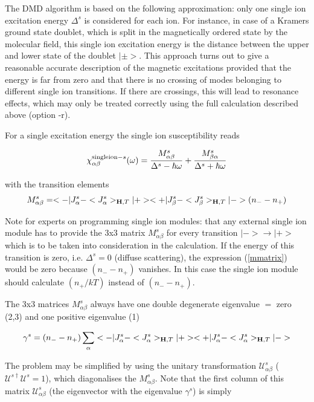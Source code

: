  The DMD algorithm is
  based on the following approximation:
  only one single ion excitation energy
$\Delta^s$ is considered for each ion. For instance, in case of a Kramers ground state
doublet, which is split in the magnetically ordered state by the molecular
field, this single ion excitation energy is the distance between the upper
and lower state of the doublet $|\pm>$.
 This approach turns out to 
give a reasonable accurate description of the magnetic excitations provided
that the energy is far from zero and that there is no crossing of modes
belonging to different single ion transitions. If there are crossings, this will lead to
resonance effects, which may only be treated correctly using the full calculation
described above (option {\prg -r}).

For a single excitation energy the single ion susceptibility
reads

\begin{equation}
\chi^{{\rm single ion-} s}_{\alpha\beta}(\omega)=
\frac{M^s_{\alpha\beta}}{\Delta^s-\hbar \omega}+
\frac{M^s_{\beta\alpha}}{\Delta^s+\hbar \omega}
\end{equation}

with the transition elements
\begin{equation}\label{mmatrix}
M^s_{\alpha\beta}=<-|J^s_{\alpha}-<J^s_{\alpha}>_{\mathbf H,T}|+><+|J^s_{\beta}-<J^s_{\beta}>_{\mathbf H,T}|->
(n_--n_+)
\end{equation}

{\tiny Note for experts on programming single ion modules: that any external single ion module has to provide the 3x3 %
matrix $M^s_{\alpha\beta}$ for every transition
$|-> \rightarrow |+>$which is to be taken into consideration in the calculation. If the energy of this transition
is zero, i.e. $\Delta^s=0$ (diffuse scattering), the expression (\ref{mmatrix}) would be zero because $(n_--n_+)$ %
vanishes.
In this case the single ion module should calculate $(n_+/kT)$ instead of $(n_--n_+)$.
}
   
 The 3x3 matrices $M^s_{\alpha\beta}$
always have one double degenerate eigenvalue $=$ zero (2,3) and one 
positive eigenvalue (1)

\begin{equation}
\gamma^s=(n_--n_+)\sum_{\alpha}<-|J^s_{\alpha}-<J^s_{\alpha}>_{\mathbf H,T}|+><+|J^s_{\alpha}-<J^s_{\alpha}>_{\mathbf H,T}|->
\end{equation}

The  problem  may be simplified by using
the unitary transformation ${\mathcal U^s_{\alpha\beta}}$ (${\mathcal U^{s\dag}\mathcal U^s}=1$), which diagonalises the %
$M^s_{\alpha\beta}$. Note that the first column of this matrix ${\mathcal U^s_{\alpha\beta}}$ (the eigenvector with the %
eigenvalue $\gamma^s$) is simply 

